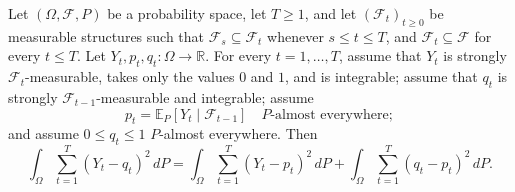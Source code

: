 \begin{theorem}
Let $(\Omega,\mathcal F,P)$ be a probability space, let $T\ge1$, and let
$(\mathcal F_t)_{t\ge0}$ be measurable structures such that
$\mathcal F_s\subseteq\mathcal F_t$ whenever $s\le t\le T$, and
$\mathcal F_t\subseteq\mathcal F$ for every $t\le T$.  Let
$Y_t,p_t,q_t:\Omega\to\mathbb R$.  For every $t=1,\ldots,T$, assume that
$Y_t$ is strongly $\mathcal F_t$-measurable, takes only the values $0$ and
$1$, and is integrable; assume that $q_t$ is strongly
$\mathcal F_{t-1}$-measurable and integrable; assume
\[
  p_t=\mathbb E_P[Y_t\mid\mathcal F_{t-1}]
  \quad P\text{-almost everywhere};
\]
and assume $0\le q_t\le1$ $P$-almost everywhere.  Then
\[
 \int_\Omega\sum_{t=1}^T(Y_t-q_t)^2\,dP
 =\int_\Omega\sum_{t=1}^T(Y_t-p_t)^2\,dP
  +\int_\Omega\sum_{t=1}^T(q_t-p_t)^2\,dP.
\]
\end{theorem}
